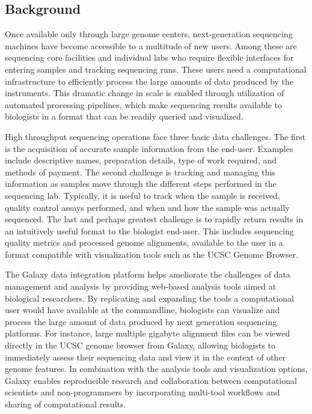 \documentclass[10pt]{bmc_article}
\newenvironment{bmcformat}{\begin{raggedright}\baselineskip20pt\sloppy\setboolean{publ}{false}}{\end{raggedright}\baselineskip20pt\sloppy}
\begin{document}
\begin{bmcformat}

\section*{Background}

Once available only through large genome centers, next-generation
sequencing machines have become accessible to a multitude of new
users. Among these are sequencing core facilities and individual labs
who require flexible interfaces for entering samples and tracking
sequencing runs. These users need a computational infrastructure to
efficiently process the large amounts of data produced by the
instruments. This dramatic change in scale is enabled through
utilization of automated processing pipelines, which make sequencing
results available to biologists in a format that can be readily
queried and visualized.

High throughput sequencing operations face three basic data
challenges. The first is the acquisition of accurate sample
information from the end-user. Examples include descriptive names,
preparation details, type of work required, and methods of
payment. The second challenge is tracking and managing this
information as samples move through the different steps performed in
the sequencing lab. Typically, it is useful to track when the sample
is received, quality control assays performed, and when and how the
sample was actually sequenced. The last and perhaps greatest challenge
is to rapidly return results in an intuitively useful format to the
biologist end-user.  This includes sequencing quality metrics and
processed genome alignments, available to the user in a format
compatible with visualization tools such as the UCSC Genome Browser.

The Galaxy data integration platform \cite{goecks_galaxy:_2010} helps
ameliorate the challenges of data management and analysis by providing web-based
analysis tools aimed at biological researchers. By replicating and
expanding the tools a computational user would have available at the
commandline, biologists can visualize and process the large amount of
data produced by next generation sequencing platforms. For instance,
large multiple gigabyte alignment files can be viewed directly in the
UCSC genome browser \cite{fujita_ucsc_2011} from Galaxy, allowing
biologists to immediately assess their sequencing data and view it in the context of 
other genome features. In combination with the analysis tools and
visualization options, Galaxy enables reproducible research and
collaboration between computational scientists and non-programmers by
incorporating multi-tool workflows and sharing of computational results.


\end{bmcformat}
\end{document}
